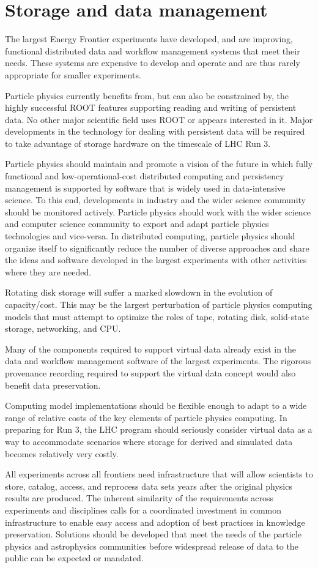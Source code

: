 \section{Storage and data management}


The largest Energy Frontier experiments have developed, and are improving,
functional distributed data and workflow management systems that meet
their needs. These systems are expensive to develop and operate and
are thus  rarely appropriate for smaller experiments.

Particle physics currently benefits from, but can also be  constrained by, the
highly successful ROOT features supporting reading  and writing of
persistent data. No other major scientific field uses  ROOT or appears
interested in it. Major developments in the technology for
dealing with persistent data will
be required to take advantage of storage hardware on the  timescale of
LHC Run 3.

Particle physics should maintain and promote a vision of the future  in which fully
functional and low-operational-cost distributed computing and
persistency management is supported by software that is widely used in
data-intensive science.  To this end, developments in industry and the
wider  science community should be monitored actively. Particle physics should work
with the wider  science and computer science community to export and
adapt particle physics technologies and  vice-versa. In distributed computing, particle physics
should organize itself to significantly  reduce the number of diverse
approaches and share the ideas and  software developed
in the largest experiments with other activities where they are needed.

Rotating disk storage will suffer a marked slowdown in the  evolution
of capacity/cost.  This may be the largest perturbation of particle physics
computing  models that must attempt to optimize the roles of tape,
rotating disk, solid-state  storage, networking, and CPU.

Many of the components required to support virtual data  already exist
in the data and workflow management software of the largest
experiments.   The rigorous provenance recording required to support
the virtual data concept would  also benefit data preservation.

Computing model implementations should be flexible  enough to adapt to
a wide range of relative costs of the key elements of particle physics  computing.
In preparing for Run 3, the LHC program should seriously consider
virtual data as a way to accommodate scenarios where storage for
derived and  simulated data becomes relatively very costly.

All experiments across all frontiers
need  infrastructure that will allow scientists to store, catalog,
access, and  reprocess data sets years after the original physics
results are produced.  The inherent similarity of the requirements
across experiments and disciplines  calls for a coordinated investment
in common infrastructure to enable easy  access and adoption of best
practices in knowledge preservation.  Solutions  should be developed
that meet the needs of the particle physics and astrophysics  communities
before widespread release of data to the public can be expected  or
mandated.

